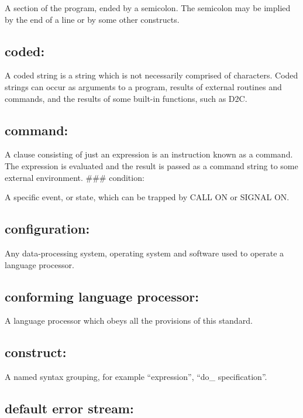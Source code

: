 A section of the program, ended by a semicolon. The semicolon may be
implied by the end of a line or by some other constructs.

\hypertarget{coded}{%
\subsection{coded:}\label{coded}}

A coded string is a string which is not necessarily comprised of
characters. Coded strings can occur as arguments to a program, results
of external routines and commands, and the results of some built-in
functions, such as D2C.

\hypertarget{command}{%
\subsection{command:}\label{command}}

A clause consisting of just an expression is an instruction known as a
command. The expression is evaluated and the result is passed as a
command string to some external environment. \#\#\# condition:

A specific event, or state, which can be trapped by CALL ON or SIGNAL
ON.

\hypertarget{configuration}{%
\subsection{configuration:}\label{configuration}}

Any data-processing system, operating system and software used to
operate a language processor.

\hypertarget{conforming-language-processor}{%
\subsection{conforming language
processor:}\label{conforming-language-processor}}

A language processor which obeys all the provisions of this standard.

\hypertarget{construct}{%
\subsection{construct:}\label{construct}}

A named syntax grouping, for example ``expression'', ``do\_
specification''.

\hypertarget{default-error-stream}{%
\subsection{default error stream:}\label{default-error-stream}}

